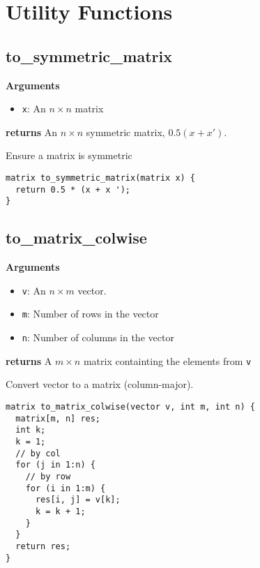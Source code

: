 \documentclass[]{book}
\providecommand{\tightlist}{%
  \setlength{\itemsep}{0pt}\setlength{\parskip}{0pt}}
\begin{document}
\section{Utility Functions}\label{utility-functions}

\subsection{to\_symmetric\_matrix}\label{to_symmetric_matrix}

\textbf{Arguments}

\begin{itemize}
\tightlist
\item
  \texttt{x}: An \(n \times n\) matrix
\end{itemize}

\textbf{returns} An \(n \times n\) symmetric matrix, \(0.5 (x + x')\).

Ensure a matrix is symmetric

\begin{verbatim}
matrix to_symmetric_matrix(matrix x) {
  return 0.5 * (x + x ');
}

\end{verbatim}

\subsection{to\_matrix\_colwise}\label{to_matrix_colwise}

\textbf{Arguments}

\begin{itemize}
\tightlist
\item
  \texttt{v}: An \(n \times m\) vector.
\item
  \texttt{m}: Number of rows in the vector
\item
  \texttt{n}: Number of columns in the vector
\end{itemize}

\textbf{returns} A \(m \times n\) matrix containting the elements from
\texttt{v}

Convert vector to a matrix (column-major).

\begin{verbatim}
matrix to_matrix_colwise(vector v, int m, int n) {
  matrix[m, n] res;
  int k;
  k = 1;
  // by col
  for (j in 1:n) {
    // by row
    for (i in 1:m) {
      res[i, j] = v[k];
      k = k + 1;
    }
  }
  return res;
}

\end{verbatim}
\end{document}
